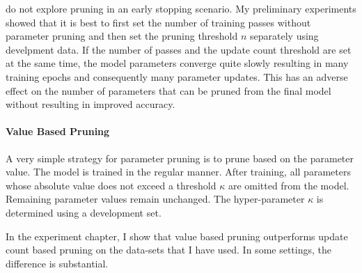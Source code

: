 \cite{Goldberg2011} do not explore pruning in an early stopping
scenario. My preliminary experiments showed that it is best to first
set the number of training passes without parameter pruning and then
set the pruning threshold $n$ separately using develpment data. If the
number of passes and the update count threshold are set at the same
time, the model parameters converge quite slowly resulting in many
training epochs and consequently many parameter updates. This has an
adverse effect on the number of parameters that can be pruned from the
final model without resulting in improved accuracy.

\paragraph{Value Based Pruning} A very simple strategy for
parameter pruning is to prune based on the parameter value. The model
is trained in the regular manner. After training, all parameters whose
absolute value does not exceed a threshold $\kappa$ are omitted from
the model. Remaining parameter values remain unchanged. The
hyper-parameter $\kappa$ is determined using a development set.

In the experiment chapter, I show that value based pruning outperforms
update count based pruning on the data-sets that I have used. In some
settings, the difference is substantial.
